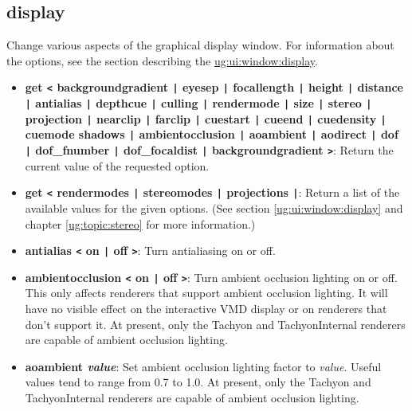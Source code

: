   \subsection{display}
  \label{ug:ui:text:display}
Change various aspects of the graphical display window.  For
information about the options, see the section describing the 
\hyperref{{\sf Display} window}{{\sf Display} window [\S }{]}{ug:ui:window:display}.


\begin{itemize} 
\item {\bf get {\tt <} backgroundgradient {\tt |} 
  eyesep {\tt |} focallength {\tt |} height {\tt |} 
  distance {\tt |} antialias {\tt |} depthcue {\tt |} 
  culling  {\tt |} rendermode {\tt |} size {\tt |} stereo {\tt |} 
  projection {\tt |} nearclip {\tt |} farclip {\tt |}
  cuestart {\tt |} cueend {\tt |} cuedensity {\tt |} cuemode 
  shadows {\tt |} ambientocclusion {\tt |} aoambient {\tt |} aodirect {\tt |}
  dof {\tt |} dof\_fnumber {\tt |} dof\_focaldist {\tt |} 
  backgroundgradient {\tt >}}: 
  Return the current value of the requested option.

 \item {\bf get {\tt <} rendermodes {\tt |} stereomodes {\tt |}  projections {\tt |}}: Return a list of the available values for the given 
  options.
  (See section \ref{ug:ui:window:display} and
  chapter \ref{ug:topic:stereo} 
  for more information.)

\item {\bf  antialias {\tt <}  on {\tt |} off {\tt >}}: Turn
    antialiasing on or off.

\item {\bf  ambientocclusion {\tt <}  on {\tt |} off {\tt >}}: Turn
    ambient occlusion lighting on or off.  This only affects renderers
    that support ambient occlusion lighting.  It will have no visible effect
    on the interactive VMD display or on renderers that don't support it.
    At present, only the Tachyon and TachyonInternal renderers are capable
    of ambient occlusion lighting.

\item {\bf  aoambient {\it value}}:
    Set ambient occlusion lighting factor to {\it value}.
    Useful values tend to range from 0.7 to 1.0. 
    At present, only the Tachyon and TachyonInternal renderers are capable
    of ambient occlusion lighting.


\end{itemize}
